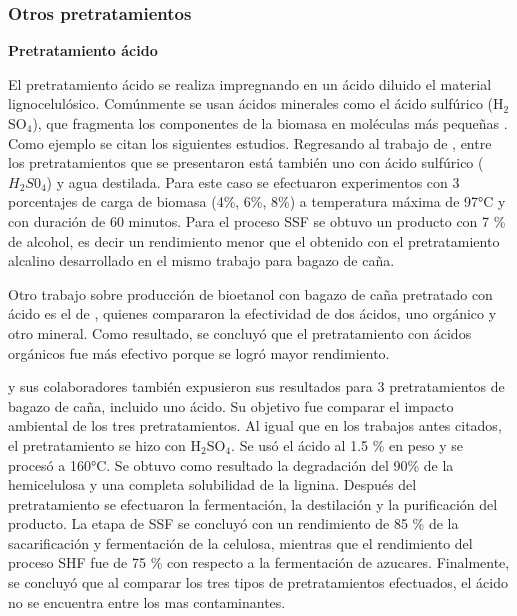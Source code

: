 \documentclass[12pt]{article}
\begin{document}








\subsubsection{Otros pretratamientos} 



\textbf{Pretratamiento ácido} 

El pretratamiento ácido se realiza impregnando en un ácido diluido el material lignocelulósico. Comúnmente se usan ácidos minerales como el ácido sulfúrico (H$_2$SO$_4$), que fragmenta los componentes de la biomasa en moléculas más pequeñas \cite{Galbe2012}. Como ejemplo se citan los siguientes estudios. %
Regresando al trabajo de \cite{Arturo2022evaluacion}, entre los pretratamientos que se presentaron está también uno con ácido sulfúrico ($H_2 S0_4$) y agua destilada. Para este caso se efectuaron experimentos con 3 porcentajes de carga de biomasa (4\%, 6\%, 8\%) a temperatura máxima de 97°C y con duración de 60 minutos. Para el proceso SSF se obtuvo un producto con 7 \% de alcohol, es decir un rendimiento menor que el obtenido con el pretratamiento alcalino desarrollado en el mismo trabajo para bagazo de caña.

Otro trabajo sobre producción de bioetanol con bagazo de caña  pretratado con ácido es el de \cite{TANTAYOTAI2022102499}, quienes compararon la efectividad de dos ácidos, uno orgánico y otro mineral. Como resultado, se concluyó que el pretratamiento con ácidos orgánicos fue más efectivo porque se logró mayor rendimiento.

\cite{rojas2010analisis} y sus colaboradores también expusieron sus resultados para 3 pretratamientos de bagazo de caña, incluido uno ácido. Su objetivo fue comparar el impacto ambiental de los tres pretratamientos. Al igual que en los trabajos antes citados, el pretratamiento se hizo con H$_2$SO$_4$. Se usó el ácido al 1.5 \% en peso y se procesó a 160°C. Se obtuvo como resultado la degradación del 90\% de la hemicelulosa y una completa solubilidad de la lignina. Después del pretratamiento se efectuaron la fermentación, la destilación y la purificación del producto. La etapa de SSF se concluyó con un rendimiento de 85 \% de la sacarificación y fermentación de la celulosa, mientras que el rendimiento del proceso SHF fue de 75 \%  con respecto a la fermentación de azucares. Finalmente, se concluyó que al comparar los tres tipos de pretratamientos efectuados, el ácido no se encuentra entre los mas contaminantes.
\end{document}
